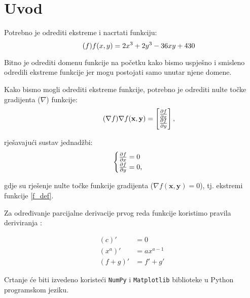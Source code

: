 \chapter{Uvod}

Potrebno je odrediti ekstreme i nacrtati funkciju:
\begin{equation}
    \tag{\hspace{0pt}{$f$}\hspace{0pt}}
    \label{f_def}
    f(x, y) = 2x^3 + 2y^3 - 36xy + 430
\end{equation}

Bitno je odrediti domenu funkcije na početku kako bismo uspješno i smisleno odredili ekstreme funkcije jer mogu postojati samo unutar njene domene.\bigskip\par

Kako bismo mogli odrediti ekstreme funkcije, potrebno je odrediti nulte točke gradijenta ($\nabla$) funkcije\cite{ccalc}:
\begin{equation}
    \tag{{$\nabla f$}}
    \label{del_f}
    \nabla f(\mathbf{x}, \mathbf{y}) = \begin{bmatrix}
        \frac{\partial f}{\partial x} \\
        \frac{\partial f}{\partial y}
    \end{bmatrix}\textnormal{,}
\end{equation}

rješavajući sustav jednadžbi:
\begin{equation}
    \label{del_f_sys}
    \begin{cases}
        \frac{\partial f}{\partial x} = 0 \\
        \frac{\partial f}{\partial y} = 0 \textnormal{,}
    \end{cases}
\end{equation}

gdje su rješenje nulte točke funkcije gradijenta ($\nabla f(\mathbf{x}, \mathbf{y}) = 0$), tj. ekstremi funkcije \eqref{f_def}.\bigskip\par

Za određivanje parcijalne derivacije prvog reda funkcije koristimo pravila deriviranja \cite{kolegij}:

\begin{align}
    (c)' &= 0 \label{rule_const} \\
    (x^a)' &= ax^{a-1} \label{rule_exp} \\
    (f + g)' &= f' + g' \label{rule_sum}
\end{align}

\vspace*{20pt}

Crtanje će biti izvedeno koristeći \verb|NumPy| i \verb|Matplotlib| biblioteke u Python programskom jeziku.\par

\newpage
